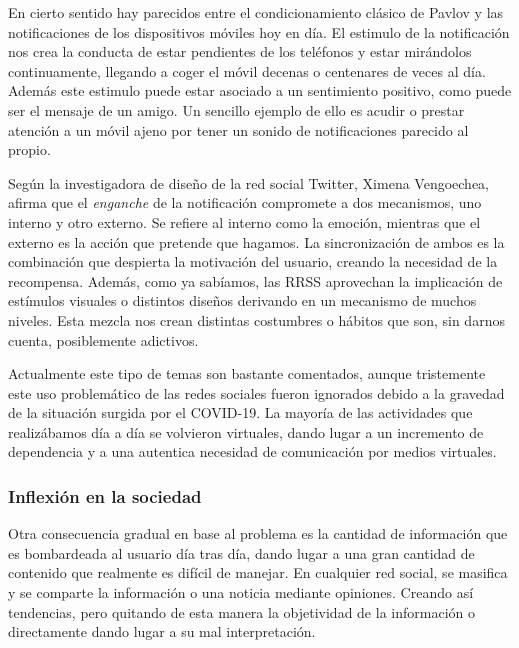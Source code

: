 \vspace{0.3cm}

En cierto sentido hay parecidos entre el condicionamiento clásico de Pavlov y las notificaciones de los dispositivos móviles hoy en día. El estimulo de la notificación nos crea la conducta de estar pendientes de los teléfonos y estar mirándolos continuamente, llegando a coger el móvil decenas o centenares de veces al día. Además este estimulo puede estar asociado a un sentimiento positivo, como puede ser el mensaje de un amigo. Un sencillo ejemplo de ello es acudir o prestar atención a un móvil ajeno por tener un sonido de notificaciones parecido al propio.

\vspace{0.3cm}

Según la investigadora de diseño de la red social Twitter, Ximena Vengoechea, afirma que el \textit{enganche} de la notificación compromete a dos mecanismos, uno interno y otro externo. \cite{Xataka-RRSS-AS} Se refiere al interno como la emoción, mientras que el externo es la acción que pretende que hagamos. La sincronización de ambos es la combinación que despierta la motivación del usuario, creando la necesidad de la recompensa. Además, como ya sabíamos, las \acs{RRSS} aprovechan la implicación de estímulos visuales o distintos diseños derivando en un mecanismo de muchos niveles. Esta mezcla nos crean distintas costumbres o hábitos que son, sin darnos cuenta, posiblemente adictivos.

\vspace{0.3cm}

Actualmente este tipo de temas son bastante comentados, aunque tristemente este uso problemático de las redes sociales fueron ignorados debido a la gravedad de la situación surgida por el COVID-19. La mayoría de las actividades que realizábamos día a día se volvieron virtuales, dando lugar a un incremento de dependencia y a una autentica necesidad de comunicación por medios virtuales.

\subsubsection{Inflexión en la sociedad}

Otra consecuencia gradual en base al problema es la cantidad de información que es bombardeada al usuario día tras día, dando lugar a una gran cantidad de contenido que realmente es difícil de manejar. En cualquier red social, se masifica y se comparte la información o una noticia mediante opiniones. Creando así tendencias, pero quitando de esta manera la objetividad de la información o directamente dando lugar a su mal interpretación.


